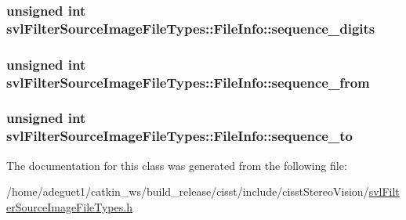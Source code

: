 \hypertarget{classsvl_filter_source_image_file_types_1_1_file_info_a00b6e0e6685952d16d283d344e39f53f}{
\subsubsection[{sequence\-\_\-digits}]{\setlength{\rightskip}{0pt plus 5cm}unsigned int svl\-Filter\-Source\-Image\-File\-Types\-::\-File\-Info\-::sequence\-\_\-digits}}\label{classsvl_filter_source_image_file_types_1_1_file_info_a00b6e0e6685952d16d283d344e39f53f}
\hypertarget{classsvl_filter_source_image_file_types_1_1_file_info_af7889fa40df40676dcb7ac7b4e2780ab}{
\subsubsection[{sequence\-\_\-from}]{\setlength{\rightskip}{0pt plus 5cm}unsigned int svl\-Filter\-Source\-Image\-File\-Types\-::\-File\-Info\-::sequence\-\_\-from}}\label{classsvl_filter_source_image_file_types_1_1_file_info_af7889fa40df40676dcb7ac7b4e2780ab}
\hypertarget{classsvl_filter_source_image_file_types_1_1_file_info_a6a3bbf38978a7fe690c9d3380208a30b}{
\subsubsection[{sequence\-\_\-to}]{\setlength{\rightskip}{0pt plus 5cm}unsigned int svl\-Filter\-Source\-Image\-File\-Types\-::\-File\-Info\-::sequence\-\_\-to}}\label{classsvl_filter_source_image_file_types_1_1_file_info_a6a3bbf38978a7fe690c9d3380208a30b}


The documentation for this class was generated from the following file\-:\begin{DoxyCompactItemize}
\item 
/home/adeguet1/catkin\-\_\-ws/build\-\_\-release/cisst/include/cisst\-Stereo\-Vision/\hyperlink{svl_filter_source_image_file_types_8h}{svl\-Filter\-Source\-Image\-File\-Types.\-h}\end{DoxyCompactItemize}
